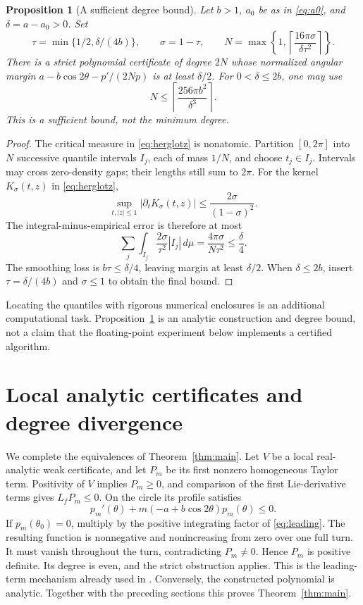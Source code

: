 \documentclass[11pt]{article}
\newtheorem{proposition}[theorem]{Proposition}
\theoremstyle{remark}\newtheorem{remark}[theorem]{Remark}
\begin{document}
\begin{proposition}[A sufficient degree bound]\label{prop:degree}
Let \(b>1\), \(a_0\) be as in \eqref{eq:a0}, and
\(\delta=a-a_0>0\). Set
\[
 \tau=\min\{1/2,\delta/(4b)\},\qquad
 \sigma=1-\tau,\qquad
 N=\max\left\{1,\left\lceil
                  \frac{16\pi\sigma}{\delta\tau^2}
                    \right\rceil\right\}.
\]
There is a strict polynomial certificate of degree \(2N\)
whose normalized angular margin
\(a-b\cos2\theta-p'/(2Np)\) is at least \(\delta/2\).
For \(0<\delta\le2b\), one may use
\[
 N\le\left\lceil\frac{256\pi b^2}{\delta^3}\right\rceil.
\]
This is a sufficient bound, not the minimum degree.
\end{proposition}
\begin{proof}
The critical measure in \eqref{eq:herglotz} is nonatomic.
Partition \([0,2\pi]\) into \(N\) successive quantile intervals
\(I_j\), each of mass \(1/N\), and choose \(t_j\in I_j\).
Intervals may cross zero-density gaps; their lengths still sum
to \(2\pi\).
For the kernel \(K_\sigma(t,z)\) in \eqref{eq:herglotz},
\[
 \sup_{t,|z|\le1}|\partial_tK_\sigma(t,z)|
       \le\frac{2\sigma}{(1-\sigma)^2}.
\]
The integral-minus-empirical error is therefore at most
\[
 \sum_j\int_{I_j}\frac{2\sigma}{\tau^2}|I_j|\,d\mu
       =\frac{4\pi\sigma}{N\tau^2}\le\frac\delta4.
\]
The smoothing loss is \(b\tau\le\delta/4\), leaving margin
at least \(\delta/2\).
When \(\delta\le2b\), insert \(\tau=\delta/(4b)\) and
\(\sigma\le1\) to obtain the final bound.
\end{proof}

Locating the quantiles with rigorous numerical enclosures is an
additional computational task. Proposition~\ref{prop:degree} is an
analytic construction and degree bound, not a claim that the
floating-point experiment below implements a certified algorithm.

\section{Local analytic certificates and degree divergence}
We complete the equivalences of Theorem~\ref{thm:main}.
Let \(V\) be a local real-analytic weak certificate, and let
\(P_m\) be its first nonzero homogeneous Taylor term.
Positivity of \(V\) implies \(P_m\ge0\), and comparison of the
first Lie-derivative terms gives \(L_fP_m\le0\).
On the circle its profile satisfies
\begin{equation}\label{eq:leading}
 p_m'(\theta)+m(-a+b\cos2\theta)p_m(\theta)\le0.
\end{equation}
If \(p_m(\theta_0)=0\), multiply by the positive integrating
factor of \eqref{eq:leading}. The resulting function is
nonnegative and nonincreasing from zero over one full turn.
It must vanish throughout the turn, contradicting \(P_m\ne0\).
Hence \(P_m\) is positive definite. Its degree is even, and
the strict obstruction applies. This is the leading-term
mechanism already used in \cite{liu}.
Conversely, the constructed polynomial is analytic.
Together with the preceding sections this proves
Theorem~\ref{thm:main}.
\end{document}
